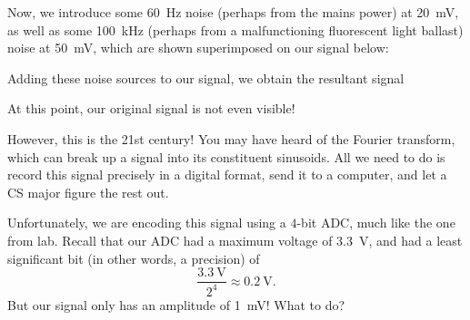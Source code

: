 \documentclass[letterpaper]{article}
\theoremstyle{remark}
\begin{document}
Now, we introduce some \SI{60}{\hertz} noise (perhaps from the mains power) at \SI{20}{\milli\volt}, as well as some \SI{100}{\kilo\hertz} (perhaps from a malfunctioning fluorescent light ballast) noise at \SI{50}{\milli\volt}, which are shown superimposed on our signal below:
\begin{center}
\end{center}
Adding these noise sources to our signal, we obtain the resultant signal
\begin{center}
\end{center}
At this point, our original signal is not even visible!

However, this is the 21st century! You may have heard of the Fourier transform, which can break up a signal into its constituent sinusoids. All we need to do is record this signal precisely in a digital format, send it to a computer, and let a CS major figure the rest out.

Unfortunately, we are encoding this signal using a $4$-bit ADC, much like the one from lab. Recall that our ADC had a maximum voltage of \SI{3.3}{\volt}, and had a least significant bit (in other words, a precision) of
\[
    \frac{\SI{3.3}{\volt}}{2^4} \approx \SI{0.2}{\volt}.
\]
But our signal only has an amplitude of \SI{1}{\milli\volt}! What to do?
\end{document}
